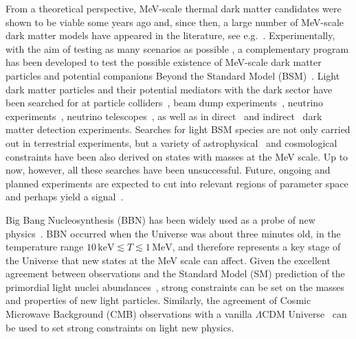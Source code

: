 \documentclass[notitlepage,letterpaper,natbib,aps,prd,onecolumn,amsmath,amsfonts,nofootinbib,preprintnumbers,superscriptaddress,secnumarabic,groupedaddress]{revtex4-1}
\begin{document}
From a theoretical perspective, MeV-scale thermal dark matter candidates were shown to be viable some years ago \cite{Boehm:2003hm,Boehm:2003bt,Feng:2008ya} and, since then, a large number of MeV-scale dark matter models have appeared in the literature, see e.g.~\cite{Boehm:2006mi,Farzan:2009ji,Farzan:2011ck,Batell:2017cmf,Ballett:2019cqp,Lamprea:2019qet,Blennow:2019fhy,Krnjaic:2015mbs,Bondarenko:2019vrb,Hochberg:2014dra,Agrawal:2014ufa,Kamada:2018zxi,Knapen:2017xzo,Hall:2009bx,Chu:2011be,Hambye:2019dwd,Dvorkin:2019zdi,Evans:2019vxr}. Experimentally, with the aim of testing as many scenarios as possible \cite{Bertone:2018xtm}, a complementary program has been developed to test the possible existence of MeV-scale dark matter particles and potential companions Beyond the Standard Model (BSM)~\cite{Essig:2013lka,Alexander:2016aln,Battaglieri:2017aum,Beacham:2019nyx}. Light dark matter particles and their potential mediators with the dark sector have been searched for at particle colliders~\cite{Borodatchenkova:2005ct,Batell:2009yf,Fox:2011fx,Essig:2013vha,Lees:2014xha,Babusci:2015zda,Lees:2017lec,Aaij:2017rft}, beam dump experiments~\cite{Bjorken:2009mm,Batell:2009di,Andreas:2012mt}, neutrino experiments~\cite{PalomaresRuiz:2007eu,Harnik:2012ni,deNiverville:2012ij,Batell:2014yra,Klop:2018ltd,Kelly:2019wow}, neutrino telescopes~\cite{Kamada:2015era,Arguelles:2017atb,Alvey:2019jzx}, as well as in direct~\cite{Essig:2015cda,Lee:2015qva,Derenzo:2016fse,Essig:2017kqs,Agnese:2018col,Agnes:2018oej,Abramoff:2019dfb,Aprile:2019xxb} and indirect~\cite{Slatyer:2015jla,Essig:2013goa,Bartels:2017dpb} dark matter detection experiments. Searches for light BSM species are not only carried out in terrestrial experiments, but a variety of astrophysical~\cite{Raffelt:1996wa,Dreiner:2013mua,Chang:2018rso,DeRocco:2019jti,Farzan:2002wx,Heurtier:2016otg} and cosmological~\cite{Xu:2018efh,Campo:2017nwh,Berlin:2018sjs,Wilkinson:2014ksa,Bertoni:2014mva,Vogel:2013raa,Escudero:2019gzq,Dolgov:2013una} constraints have been also derived on states with masses at the MeV scale. Up to now, however, all these searches have been unsuccessful. Future, ongoing and planned experiments are expected to cut into relevant regions of parameter space and perhaps yield a signal~\cite{Essig:2013lka,Alexander:2016aln,Battaglieri:2017aum,Beacham:2019nyx,Kou:2018nap,Ariga:2019ufm,Alekhin:2015byh,Chou:2016lxi,Akesson:2018vlm}.


Big Bang Nucleosynthesis (BBN) has been widely used as a probe of new physics~\cite{Sarkar:1995dd,Iocco:2008va,Pospelov:2010hj}. BBN occurred when the Universe was about three minutes old, in the temperature range $10\,\text{keV}  \lesssim T \lesssim 1\,\text{MeV}$, and therefore represents a key stage of the Universe that new states at the MeV scale can affect. Given the excellent agreement between observations and the Standard Model (SM) prediction of the primordial light nuclei abundances~\cite{pdg}, strong constraints can be set on the masses and properties of new light particles. Similarly, the agreement of Cosmic Microwave Background (CMB) observations with a vanilla $\Lambda$CDM Universe~\cite{Aghanim:2018eyx} can be used to set strong constraints on light new physics.
\end{document}
